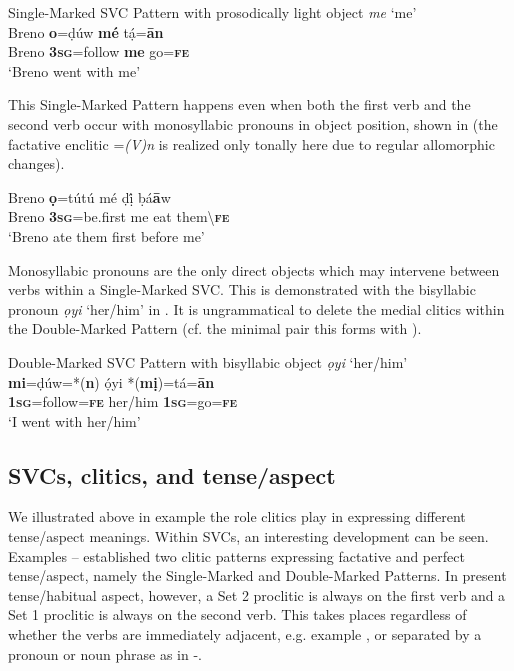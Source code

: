 \documentclass[output=paper]{langsci/langscibook}
\begin{document}
\ea\label{ex:rolle:11}
{Single-Marked SVC Pattern with prosodically light object \textit{me} ‘me’}\\
\gll  Breno  \textbf{o}=ḍúw    \textbf{mé}  tạ́=\textbf{ān}\\
     Breno   \textbf{3}\textbf{\textsc{sg}}=follow   \textbf{me}  go=\textbf{\textsc{fe}}\\
\glt ‘Breno went with me’ \citep[115]{Kari2004}
\z


This Single-Marked Pattern happens even when both the first verb and the second verb occur with monosyllabic pronouns in object position, shown in  (the factative enclitic =\textit{(V)n} is realized only tonally here due to regular allomorphic changes).

\ea\label{ex:rolle:12}
\gll  Breno   \textbf{ọ}=tútú     mé   ḍị́   ḅá\textbf{ā}w\\
     Breno  \textbf{\textsc{3sg}}=be.first  me  eat  them{\textbackslash}\textbf{\textsc{fe}}\\
\glt ‘Breno ate them first before me’
\z

Monosyllabic pronouns are the only direct objects which may intervene between verbs within a Single-Marked SVC. This is demonstrated with the bisyllabic pronoun \textit{ọyi} ‘her/him’ in . It is ungrammatical to delete the medial clitics within the Double-Marked Pattern (cf. the minimal pair this forms with ). 

\ea\label{ex:rolle:13}
{Double-Marked SVC Pattern with bisyllabic object \textit{ọyi} ‘her/him’}\\
\gll  \textbf{mi}=ḍúw=*(\textbf{n})     ọ́yi     *(\textbf{mị})=tá=\textbf{ān}\\
     \textbf{1\textsc{sg}}=follow=\textbf{\textsc{fe}}   her/him   \textbf{1\textsc{sg}}=go=\textbf{\textsc{fe}}\\
\glt ‘I went with her/him’ \citep[201]{Kari2004}
\z

\subsection{SVCs, clitics, and tense/aspect}

We illustrated above in example  the role clitics play in expressing different tense/aspect meanings. Within SVCs, an interesting development can be seen. Examples -- established two clitic patterns expressing factative and perfect tense/aspect, namely the Single-Marked and Double-Marked Patterns. In present tense/habitual aspect, however, a Set 2 proclitic is always on the first verb and a Set 1 proclitic is always on the second verb. This takes places regardless of whether the verbs are immediately adjacent, e.g. example , or separated by a pronoun or noun phrase as in -. 
\end{document}
